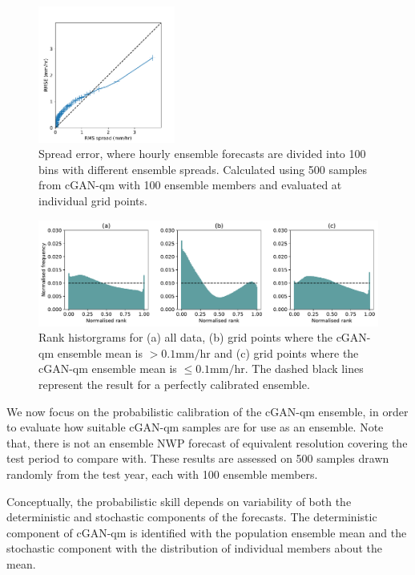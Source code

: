 \documentclass{article}
\begin{document}
    
\begin{figure}
    \centering
     \includegraphics[width=0.4\textwidth]{images/spread_error_final-nologs_217600.pdf}
     \caption{Spread error, where hourly ensemble forecasts are divided into 100 bins with different ensemble spreads. Calculated using 500 samples from cGAN-qm with 100 ensemble members and evaluated at individual grid points. }
     \label{fig:spread_error}
\end{figure}

\begin{figure}[t]
    \centering\includegraphics[width=\textwidth]{images/rank_hist_final-nologs_217600_all.pdf}
     
    
     \caption{Rank historgrams for (a) all data, (b) grid points where the cGAN-qm ensemble mean is $>0.1\text{mm/hr}$ and (c) grid points where the cGAN-qm ensemble mean is $\leq 0.1\text{mm/hr}$. The dashed black lines represent the result for a perfectly calibrated ensemble. }
     \label{fig:rank_hist}
\end{figure}


We now focus on the probabilistic calibration of the cGAN-qm ensemble, in order to evaluate how suitable cGAN-qm samples are for use as an ensemble. Note that, there is not an ensemble NWP forecast of equivalent resolution covering the test period to compare with. These results are assessed on 500 samples drawn randomly from the test year, each with 100 ensemble members. 

Conceptually, the probabilistic skill depends on variability of both the deterministic and stochastic components of the forecasts. The deterministic component of cGAN-qm is identified with the population ensemble mean and the stochastic component with the distribution of individual members about the mean.
\end{document}

